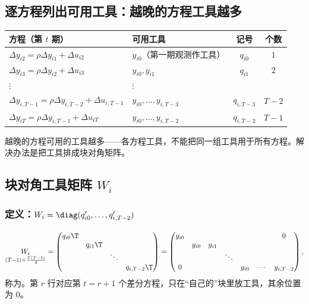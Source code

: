 \subsection{逐方程列出可用工具：越晚的方程工具越多}

\begin{center}
\small
\begin{tabular}{llcc}
\toprule
方程（第 $t$ 期） & 可用工具 & 记号 & 个数\\
\midrule
$\Delta y_{i2}=\rho\Delta y_{i1}+\Delta u_{i2}$ & $y_{i0}$（第一期观测作工具） & $q_{i0}$ & $1$\\
$\Delta y_{i3}=\rho\Delta y_{i2}+\Delta u_{i3}$ & $y_{i0},y_{i1}$ & $q_{i1}$ & $2$\\
\quad$\vdots$ & \quad$\vdots$ & & \\
$\Delta y_{i,T-1}=\rho\Delta y_{i,T-2}+\Delta u_{i,T-1}$ & $y_{i0},\dots,y_{i,T-3}$ & $q_{i,T-3}$ & $T-2$\\
$\Delta y_{iT}=\rho\Delta y_{i,T-1}+\Delta u_{iT}$ & $y_{i0},\dots,y_{i,T-2}$ & $q_{i,T-2}$ & $T-1$\\
\bottomrule
\end{tabular}
\end{center}

越晚的方程可用的工具越多——各方程工具，不能把同一组工具用于所有方程。解决办法是把工具排成块对角矩阵。

\subsection{块对角工具矩阵 \texorpdfstring{$W_i$}{W\_i}}

\subsubsection{定义：\texorpdfstring{$W_i=\diag(q_{i0}',\dots,q_{i,T-2}')$}{W = diag(q')}}

\begin{defn}\label{def:U12b-Wi}
\[
\underset{(T-1)\times\frac{T(T-1)}{2}}{W_i}
=\begin{pmatrix} q_{i0}\T & & & \\ & q_{i1}\T & & \\ & & \ddots & \\ & & & q_{i,T-2}\T\end{pmatrix}
=\begin{pmatrix} y_{i0} & & & & & & 0\\ & y_{i0} & y_{i1} & & & & \\ & & & \ddots & & & \\ 0 & & & & y_{i0} & \cdots & y_{i,T-2}\end{pmatrix},
\]
称为。第 $r$ 行对应第 $t=r+1$ 个差分方程，只在“自己的”块里放工具，其余位置为 $0$。
\end{defn}

